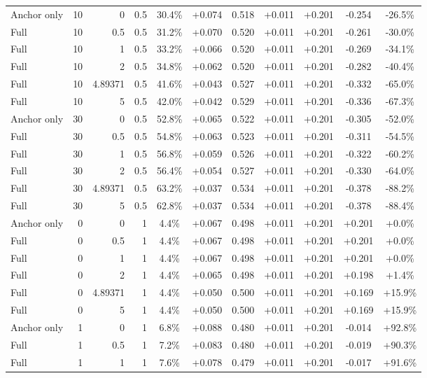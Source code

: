 \begin{table}[htbp]
\begin{tabular}{lrrrccccccc}
Anchor only & 10 & 0 & 0.5 & 30.4\% & +0.074 & 0.518 & +0.011 & +0.201 & -0.254 & -26.5\% \\
Full & 10 & 0.5 & 0.5 & 31.2\% & +0.070 & 0.520 & +0.011 & +0.201 & -0.261 & -30.0\% \\
Full & 10 & 1 & 0.5 & 33.2\% & +0.066 & 0.520 & +0.011 & +0.201 & -0.269 & -34.1\% \\
Full & 10 & 2 & 0.5 & 34.8\% & +0.062 & 0.520 & +0.011 & +0.201 & -0.282 & -40.4\% \\
Full & 10 & 4.89371 & 0.5 & 41.6\% & +0.043 & 0.527 & +0.011 & +0.201 & -0.332 & -65.0\% \\
Full & 10 & 5 & 0.5 & 42.0\% & +0.042 & 0.529 & +0.011 & +0.201 & -0.336 & -67.3\% \\
Anchor only & 30 & 0 & 0.5 & 52.8\% & +0.065 & 0.522 & +0.011 & +0.201 & -0.305 & -52.0\% \\
Full & 30 & 0.5 & 0.5 & 54.8\% & +0.063 & 0.523 & +0.011 & +0.201 & -0.311 & -54.5\% \\
Full & 30 & 1 & 0.5 & 56.8\% & +0.059 & 0.526 & +0.011 & +0.201 & -0.322 & -60.2\% \\
Full & 30 & 2 & 0.5 & 56.4\% & +0.054 & 0.527 & +0.011 & +0.201 & -0.330 & -64.0\% \\
Full & 30 & 4.89371 & 0.5 & 63.2\% & +0.037 & 0.534 & +0.011 & +0.201 & -0.378 & -88.2\% \\
Full & 30 & 5 & 0.5 & 62.8\% & +0.037 & 0.534 & +0.011 & +0.201 & -0.378 & -88.4\% \\
Anchor only & 0 & 0 & 1 & 4.4\% & +0.067 & 0.498 & +0.011 & +0.201 & +0.201 & +0.0\% \\
Full & 0 & 0.5 & 1 & 4.4\% & +0.067 & 0.498 & +0.011 & +0.201 & +0.201 & +0.0\% \\
Full & 0 & 1 & 1 & 4.4\% & +0.067 & 0.498 & +0.011 & +0.201 & +0.201 & +0.0\% \\
Full & 0 & 2 & 1 & 4.4\% & +0.065 & 0.498 & +0.011 & +0.201 & +0.198 & +1.4\% \\
Full & 0 & 4.89371 & 1 & 4.4\% & +0.050 & 0.500 & +0.011 & +0.201 & +0.169 & +15.9\% \\
Full & 0 & 5 & 1 & 4.4\% & +0.050 & 0.500 & +0.011 & +0.201 & +0.169 & +15.9\% \\
Anchor only & 1 & 0 & 1 & 6.8\% & +0.088 & 0.480 & +0.011 & +0.201 & -0.014 & +92.8\% \\
Full & 1 & 0.5 & 1 & 7.2\% & +0.083 & 0.480 & +0.011 & +0.201 & -0.019 & +90.3\% \\
Full & 1 & 1 & 1 & 7.6\% & +0.078 & 0.479 & +0.011 & +0.201 & -0.017 & +91.6\% \\

\end{tabular}
\end{table}
